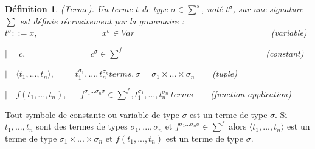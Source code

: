 \documentclass[9pt]{book}
\newtheorem{definition}{D\'efinition}[section]
\begin{document}
\begin{definition} (Terme).
Un terme $t$ de type $\sigma \in \sum^{s}$, not\'e $t^{\sigma}$, sur une signature $\sum$ est d\'efinie r\'ecrusivement par la grammaire :\\
$t^{\sigma} ::= x,$ ~~~~~~~~~~~~~~$x^{\sigma} \in Var$ ~~~~~~~~~~~~~~~~~~~~~~~~~~~~~~ (variable) \par
$|$~~ $c,$ ~~~~~~~~~~~~~~$c^{\sigma} \in \sum^{f}$ ~~~~~~~~~~~~~~~~~~~~~~~~~~~~~~~~(constant) \par
$|$~~$\langle t_{1},...,t_{n}\rangle,$~~~~ $t_{1}^{\sigma_{1}},...,t_{n}^{\sigma_{n}} terms, \sigma = \sigma_{1} \times ... \times \sigma_{n}$~~~~(tuple) \par
$|$~~$f(t_{1},...,t_{n}),$~~~$f^{\sigma_{1} ...\sigma_{n} \sigma} \in \sum^{f}, t_{1}^{\sigma_{1}},...,t_{n}^{\sigma_{n}} ~terms$~~~~(function application)
\end{definition}
	Tout symbole de constante ou variable de type $\sigma$ est un terme de type $\sigma$. Si $t_{1},...,t_{n}$ sont des termes de types $\sigma_{1},...,\sigma_{n}$ et $f^{\sigma_{1} ...\sigma_{n} \sigma} \in \sum^{f}$ alors $\langle t_{1},...,t_{n}\rangle$ est un terme de type $\sigma_{1} \times ... \times \sigma_{n}$ et $f(t_{1},...,t_{n})$ est un terme de type $\sigma$.\par
\end{document}
